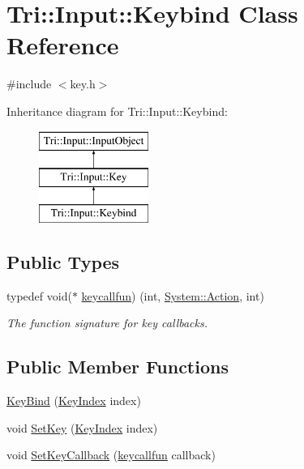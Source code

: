 \hypertarget{class_tri_1_1_input_1_1_keybind}{}\section{Tri\+:\+:Input\+:\+:Keybind Class Reference}
\label{class_tri_1_1_input_1_1_keybind}


{\ttfamily \#include $<$key.\+h$>$}

Inheritance diagram for Tri\+:\+:Input\+:\+:Keybind\+:\begin{figure}[H]
\begin{center}
\leavevmode
\includegraphics[height=3.000000cm]{class_tri_1_1_input_1_1_keybind}
\end{center}
\end{figure}
\subsection*{Public Types}
\begin{DoxyCompactItemize}
\item 
typedef void($\ast$ \hyperlink{class_tri_1_1_input_1_1_keybind_ad673cad554dbcc91f9158d0e28ddde35}{keycallfun}) (int, \hyperlink{namespace_tri_1_1_input_1_1_system_a79600e9f4ed835251eed1706ce96bed0}{System\+::\+Action}, int)
\begin{DoxyCompactList}\small\item\em The function signature for key callbacks. \end{DoxyCompactList}\end{DoxyCompactItemize}
\subsection*{Public Member Functions}
\begin{DoxyCompactItemize}
\item 
\hyperlink{class_tri_1_1_input_1_1_keybind_a24061b2a16170f851af53c4895b00c21}{Key\+Bind} (\hyperlink{struct_tri_1_1_input_1_1_key_a0b1f54fb1b7be8fe2e920ca8552f86dc}{Key\+Index} index)
\item 
void \hyperlink{class_tri_1_1_input_1_1_keybind_a4d71f6463f2e057e024fc6e4018b2207}{Set\+Key} (\hyperlink{struct_tri_1_1_input_1_1_key_a0b1f54fb1b7be8fe2e920ca8552f86dc}{Key\+Index} index)
\item 
void \hyperlink{class_tri_1_1_input_1_1_keybind_abdb6f9de4e66aed3c24f90c62aed1043}{Set\+Key\+Callback} (\hyperlink{class_tri_1_1_input_1_1_keybind_ad673cad554dbcc91f9158d0e28ddde35}{keycallfun} callback)
\end{DoxyCompactItemize}
